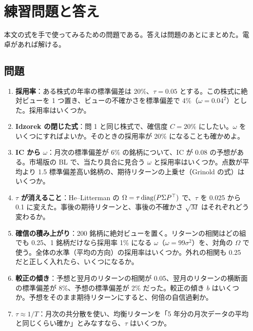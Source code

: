\chapter{練習問題と答え}\label{app:exercises}

本文の式を手で使ってみるための問題である。答えは問題のあとにまとめた。電卓があれば解ける。

\section{問題}

\begin{enumerate}[label=\textbf{問 \arabic*.},leftmargin=3.2em]
\item \textbf{採用率}：ある株式の年率の標準偏差は 20\%、$\tau=0.05$ とする。この株式に絶対ビューを 1 つ置き、ビューの不確かさを標準偏差で 4\%（$\omega=0.04^2$）とした。採用率はいくつか。

\item \textbf{Idzorek の閉じた式}：問 1 と同じ株式で、確信度 $C=20\%$ にしたい。$\omega$ をいくつにすればよいか。そのときの採用率が 20\% になることも確かめよ。

\item \textbf{IC から $\omega$}：月次の標準偏差が 6\% の銘柄について、IC が 0.08 の予想がある。市場版の BL で、当たり具合に見合う $\omega$ と採用率はいくつか。点数が平均より 1.5 標準偏差高い銘柄の、期待リターンの上乗せ（Grinold の式）はいくつか。

\item \textbf{$\tau$ が消えること}：He--Litterman の $\Omega=\tau\operatorname{diag}(P\Sigma P^{\top})$ で、$\tau$ を 0.025 から 0.1 に変えた。事後の期待リターンと、事後の不確かさ $\sqrt M$ はそれぞれどう変わるか。

\item \textbf{確信の積み上がり}：200 銘柄に絶対ビューを置く。リターンの相関はどの組でも 0.25、1 銘柄だけなら採用率 1\% になる $\omega$（$\omega=99\sigma^2$）を、対角の $\Omega$ で使う。全体の水準（平均の方向）の採用率はいくつか。外れの相関も 0.25 だと正しく入れたら、いくつになるか。

\item \textbf{較正の傾き}：予想と翌月のリターンの相関が 0.05、翌月のリターンの横断面の標準偏差が 8\%、予想の標準偏差が 2\% だった。較正の傾き $b$ はいくつか。予想をそのまま期待リターンにすると、何倍の自信過剰か。

\item \textbf{$\tau\approx1/T$}：月次の共分散を使い、均衡リターンを「5 年分の月次データの平均と同じくらい確か」とみなすなら、$\tau$ はいくつか。


\end{enumerate}
